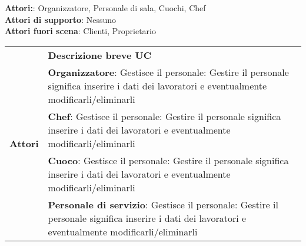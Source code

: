   \textbf{Attori:}: Organizzatore, Personale di sala, Cuochi, Chef \\
  \textbf{Attori di supporto}: Nessuno \\ 
  \textbf{Attori fuori scena}: Clienti, Proprietario \\

  \begin{longtable}{|p{4cm}|p{8cm}|}
    \hline
    \multirow{5}{*}{\textbf{Attori}} & \textbf{Descrizione breve UC} \\ \cline{2-2}
     & \textbf{Organizzatore}: Gestisce il personale: Gestire il personale significa inserire i dati dei lavoratori e eventualmente modificarli/eliminarli \\ \cline{2-2}
     & \textbf{Chef}: Gestisce il personale: Gestire il personale significa inserire i dati dei lavoratori e eventualmente modificarli/eliminarli \\ \cline{2-2}
     & \textbf{Cuoco}: Gestisce il personale: Gestire il personale significa inserire i dati dei lavoratori e eventualmente modificarli/eliminarli \\ \cline{2-2}
     & \textbf{Personale di servizio}: Gestisce il personale: Gestire il personale significa inserire i dati dei lavoratori e eventualmente modificarli/eliminarli \\ \hline
  \end{longtable}


